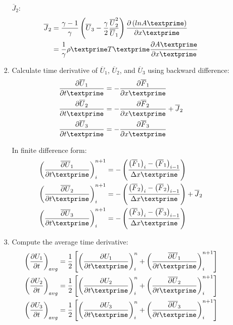 \documentclass[12pt]{article}
\begin{document}
\begin{enumerate}
\begin{enumerate}
\begin{enumerate}
				\par $\overline{J}_{2}$:
				\begin{align}
					\overline{J}_{2} 	&= \frac{\gamma - 1}{\gamma}\left(\overline{U}_{3} - \frac{\gamma}{2}\frac{\overline{U}_{2}^{2}}{\overline{U}_{1}}\right)\frac{\partial\left(ln A\textprime\right)}{\partial x\textprime} \\
						&= \frac{1}{\gamma}\rho\textprime T\textprime\frac{\partial A\textprime}{\partial x\textprime}
				\end{align}
			\item Calculate time derivative of $\overline{U}_1$, $\overline{U}_2$, and $\overline{U}_3$ using backward difference:
				\begin{align}
					\frac{\partial \overline{U}_1}{\partial t\textprime} &= - \frac{\partial \overline{F}_1}{\partial x\textprime}\\
					\frac{\partial \overline{U}_2}{\partial t\textprime} &= - \frac{\partial \overline{F}_2}{\partial x\textprime} + \overline{J}_2\\
					\frac{\partial \overline{U}_3}{\partial t\textprime} &= - \frac{\partial \overline{F}_3}{\partial x\textprime}
				\end{align}
				\par In finite difference form:
				\begin{align}
					\left(\frac{\overline{\partial U}_1}{\partial t\textprime}\right)_{i}^{n+1} &= -\left(\frac{\left(\overline{F}_{1}\right)_{i} - \left(\overline{F}_{1}\right)_{i-1}}{\Delta x\textprime}\right) \\
					\left(\frac{\overline{\partial U}_2}{\partial t\textprime}\right)_{i}^{n+1} &= -\left(\frac{\left(\overline{F}_{2}\right)_{i} - \left(\overline{F}_{2}\right)_{i-1}}{\Delta x\textprime}\right) + \overline{J}_2 \\
					\left(\frac{\overline{\partial U}_3}{\partial t\textprime}\right)_{i}^{n+1} &= -\left(\frac{\left(\overline{F}_{3}\right)_{i} - \left(\overline{F}_{3}\right)_{i-1}}{\Delta x\textprime}\right) 
				\end{align}
			\item Compute the average time derivative:
				\begin{align}
					\left(\frac{\partial U_{1}}{\partial t}\right)_{avg} &= \frac{1}{2}\left[\left(\frac{\partial U_{1}}{\partial t\textprime}\right)_{i}^{n} + \left(\frac{\overline{\partial U}_{1}}{\partial t\textprime}\right)_{i}^{n+1} \right] \\
					\left(\frac{\partial U_{2}}{\partial t}\right)_{avg} &= \frac{1}{2}\left[\left(\frac{\partial U_{2}}{\partial t\textprime}\right)_{i}^{n} + \left(\frac{\overline{\partial U}_{2}}{\partial t\textprime}\right)_{i}^{n+1} \right] \\
					\left(\frac{\partial U_{3}}{\partial t}\right)_{avg} &= \frac{1}{2}\left[\left(\frac{\partial U_{3}}{\partial t\textprime}\right)_{i}^{n} + \left(\frac{\overline{\partial U}_{3}}{\partial t\textprime}\right)_{i}^{n+1} \right] 
				\end{align}


\end{enumerate}
\end{enumerate}
\end{enumerate}
\end{document}
